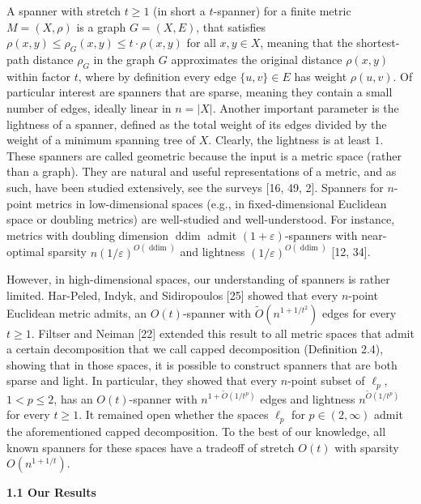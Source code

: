 A spanner with stretch $t\geq 1$ (in short a $t$-spanner) for a finite metric $M=(X,\rho)$ is a graph $G=(X,E)$, that satisfies $\rho(x,y)\leq\rho_{G}(x,y)\leq t\cdot\rho(x,y)$ for all $x,y\in X$, meaning that the shortest-path distance $\rho_{G}$ in the graph $G$ approximates the original distance $\rho(x,y)$ within factor $t$, where by definition every edge $\{u,v\}\in E$ has weight $\rho(u,v)$. Of particular interest are spanners that are sparse, meaning they contain a small number of edges, ideally linear in $n=|X|$. Another important parameter is the lightness of a spanner, defined as the total weight of its edges divided by the weight of a minimum spanning tree of $X$. Clearly, the lightness is at least $1$. These spanners are called geometric because the input is a metric space (rather than a graph). They are natural and useful representations of a metric, and as such, have been studied extensively, see the surveys [16, 49, 2]. Spanners for $n$-point metrics in low-dimensional spaces (e.g., in fixed-dimensional Euclidean space or doubling metrics) are well-studied and well-understood. For instance, metrics with doubling dimension $\operatorname{ddim}$ admit $(1+\varepsilon)$-spanners with near-optimal sparsity $n(1/\varepsilon)^{O(\operatorname{ddim})}$ and lightness $(1/\varepsilon)^{O(\operatorname{ddim})}$ [12, 34].
\par
\par
However, in high-dimensional spaces, our understanding of spanners is rather limited. Har-Peled, Indyk, and Sidiropoulos [25] showed that every $n$-point Euclidean metric admits, an $O(t)$-spanner with $\tilde{O}(n^{1+1/t^{2}})$ edges for every $t\geq 1$. Filtser and Neiman [22] extended this result to all metric spaces that admit a certain decomposition that we call capped decomposition (Definition 2.4), showing that in those spaces, it is possible to construct spanners that are both sparse and light. In particular, they showed that every $n$-point subset of $\ell_{p}$, $1<p\leq 2$, has an $O(t)$-spanner with $n^{1+\tilde{O}(1/t^{p})}$ edges and lightness $n^{\tilde{O}(1/t^{p})}$ for every $t\geq 1$. It remained open whether the spaces $\ell_{p}$ for $p\in(2,\infty)$ admit the aforementioned capped decomposition. To the best of our knowledge, all known spanners for these spaces have a tradeoff of stretch $O(t)$ with sparsity $O(n^{1+1/t})$.
\par
\par
\par
\par\medskip\noindent\textbf{1.1 Our Results}\par
